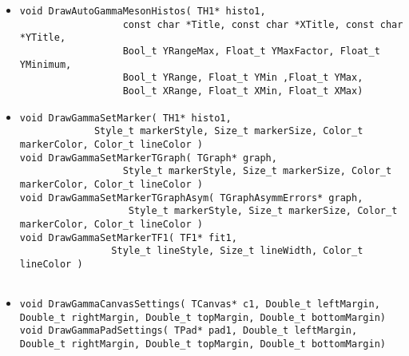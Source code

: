 \begin{itemize}
\item 	\begin{lstlisting}
void DrawAutoGammaMesonHistos( TH1* histo1, 
			      const char *Title, const char *XTitle, const char *YTitle, 
			      Bool_t YRangeMax, Float_t YMaxFactor, Float_t YMinimum, 
			      Bool_t YRange, Float_t YMin ,Float_t YMax, 
			      Bool_t XRange, Float_t XMin, Float_t XMax)      	 
      	\end{lstlisting}
\item 	\begin{lstlisting}
void DrawGammaSetMarker( TH1* histo1, 
			 Style_t markerStyle, Size_t markerSize, Color_t markerColor, Color_t lineColor )
void DrawGammaSetMarkerTGraph( TGraph* graph, 
			      Style_t markerStyle, Size_t markerSize, Color_t markerColor, Color_t lineColor )      	 
void DrawGammaSetMarkerTGraphAsym( TGraphAsymmErrors* graph, 
				   Style_t markerStyle, Size_t markerSize, Color_t markerColor, Color_t lineColor )     	 
void DrawGammaSetMarkerTF1( TF1* fit1, 
			    Style_t lineStyle, Size_t lineWidth, Color_t lineColor )      	 
      	 
      	\end{lstlisting}
\item 	\begin{lstlisting}
void DrawGammaCanvasSettings( TCanvas* c1, Double_t leftMargin, Double_t rightMargin, Double_t topMargin, Double_t bottomMargin)
void DrawGammaPadSettings( TPad* pad1, Double_t leftMargin, Double_t rightMargin, Double_t topMargin, Double_t bottomMargin)      	 
      	\end{lstlisting}
		\end{itemize}

